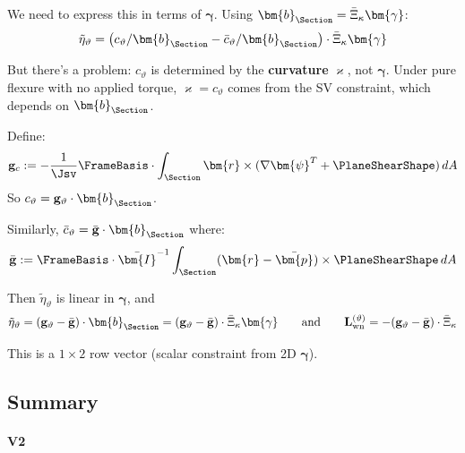 We need to express this in terms of \(\bm{\gamma}\). Using
\(\bm{b}_{\Section} = \bar{\Xi}_\kappa\bm{\gamma}\):
\[\tilde{\eta}_\vartheta = \left(c_\vartheta/\bm{b}_{\Section} - \bar{c}_{\vartheta}/\bm{b}_{\Section}\right)\cdot\bar{\Xi}_\kappa\bm{\gamma}\]

But there's a problem: \(c_\vartheta\) is determined by the
\textbf{curvature} \(\varkappa\), not \(\bm{\gamma}\). Under pure
flexure with no applied torque, \(\varkappa = c_\vartheta\) comes from
the SV constraint, which depends on \(\bm{b}_{\Section}\).


Define:
\[
\mathbf{g}_{c} := -\frac{1}{\Jsv}\FrameBasis\cdot\int_{\Section} \bm{r}\times(\nabla\bm{\psi}^T + \PlaneShearShape)\,dA
\]
So \(c_\vartheta = \mathbf{g}_{\vartheta}\cdot\bm{b}_{\Section}\).

Similarly, \(\bar{c}_{\vartheta} = \bar{\mathbf{g}}\cdot\bm{b}_{\Section}\)
where:
\[
\bar{\mathbf{g}} := \FrameBasis\cdot\bar{\bm{I}}^{-1} \int_{\Section} (\bm{r}-\bar{\bm{p}})\times\PlaneShearShape\,dA
\]

Then \(\tilde{\eta}_{\vartheta}\) is linear in \(\bm{\gamma}\), and
\[
\tilde{\eta}_\vartheta = (\mathbf{g}_{\vartheta} - \bar{\mathbf{g}})\cdot\bm{b}_{\Section} = (\mathbf{g}_{\vartheta} - \bar{\mathbf{g}})\cdot\bar{\Xi}_\kappa\bm{\gamma}
\qquad\text{and}\qquad
\mathbf{L}_{\rm wn}^{(\vartheta)} = -(\mathbf{g}_{\vartheta} - \bar{\mathbf{g}})\cdot\bar{\Xi}_\kappa
\]

This is a \(1\times 2\) row vector (scalar constraint from 2D
\(\bm{\gamma}\)).


\subsection{Summary}

\paragraph{V2}

